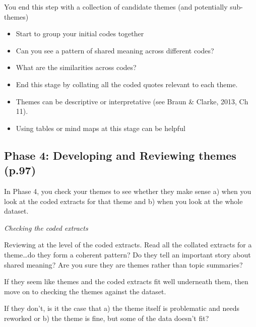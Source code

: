 \documentclass[
  english,
  letterpaper,
  DIV=11,
  numbers=noendperiod]{scrreprt}
\providecommand{\tightlist}{%
  \setlength{\itemsep}{0pt}\setlength{\parskip}{0pt}}
\begin{document}
You end this step with a collection of candidate themes (and potentially
sub-themes)

\begin{tcolorbox}[enhanced jigsaw, breakable, bottomtitle=1mm, leftrule=.75mm, opacityback=0, colbacktitle=quarto-callout-warning-color!10!white, opacitybacktitle=0.6, toprule=.15mm, colback=white, left=2mm, coltitle=black, bottomrule=.15mm, titlerule=0mm, title={Practical Steps}, toptitle=1mm, colframe=quarto-callout-warning-color-frame, arc=.35mm, rightrule=.15mm]

\begin{itemize}
\tightlist
\item
  Start to group your initial codes together
\item
  Can you see a pattern of shared meaning across different codes?
\item
  What are the similarities across codes?
\item
  End this stage by collating all the coded quotes relevant to each
  theme.
\item
  Themes can be descriptive or interpretative (see Braun \& Clarke,
  2013, Ch 11).
\item
  Using tables or mind maps at this stage can be helpful
\end{itemize}

\end{tcolorbox}

\subsection{Phase 4: Developing and Reviewing themes
(p.97)}\label{phase-4-developing-and-reviewing-themes-p.97}

In Phase 4, you check your themes to see whether they make sense a) when
you look at the coded extracts for that theme and b) when you look at
the whole dataset.

\emph{Checking the coded extracts}

Reviewing at the level of the coded extracts. Read all the collated
extracts for a theme\ldots do they form a coherent pattern? Do they tell
an important story about shared meaning? Are you sure they are themes
rather than topic summaries?

If they seem like themes and the coded extracts fit well underneath
them, then move on to checking the themes against the dataset.

If they don't, is it the case that a) the theme itself is problematic
and needs reworked or b) the theme is fine, but some of the data doesn't
fit?
\end{document}
